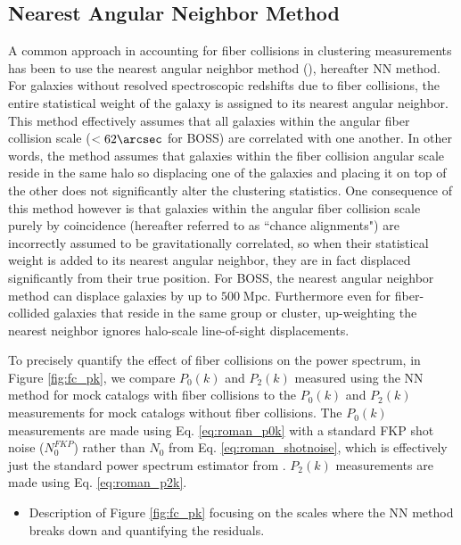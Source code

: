 \documentclass{emulateapj}
\begin{document}
\subsection{Nearest Angular Neighbor Method} \label{sec:fc_pk}
A common approach in accounting for fiber collisions in clustering measurements has been to use the nearest angular neighbor method (\citealt{Zehavi:2002aa, Berlind:2006aa, Anderson:2012aa}), hereafter NN method. For galaxies without resolved spectroscopic redshifts due to fiber collisions, the entire statistical weight of the galaxy is assigned to its nearest angular neighbor. This method effectively assumes that all galaxies within the angular fiber collision scale ($< 62 \arcsec$ for BOSS) are correlated with one another. In other words, the method assumes that galaxies within the fiber collision angular scale reside in the same halo so displacing one of the galaxies and placing it on top of the other does not significantly alter the clustering statistics. One consequence of this method however is that galaxies within the angular fiber collision scale purely by coincidence (hereafter referred to as ``chance alignments") are incorrectly assumed to be gravitationally correlated, so when their statistical weight is added to its nearest angular neighbor, they are in fact displaced significantly from their true position. For BOSS, the nearest angular neighbor method can displace galaxies by up to $500 \;\mathrm{Mpc}$. Furthermore even for fiber-collided galaxies that reside in the same group or cluster, up-weighting the nearest neighbor ignores halo-scale line-of-sight displacements. 

To precisely quantify the effect of fiber collisions on the power spectrum, in Figure \ref{fig:fc_pk}, we compare $P_0(k)$ and $P_2(k)$ measured using the NN method for mock catalogs with fiber collisions to the $P_0(k)$ and $P_2(k)$ measurements for mock catalogs without fiber collisions. The $P_0(k)$ measurements are made using Eq. \ref{eq:roman_p0k} with a standard FKP shot noise ($N_0^{FKP}$) rather than $N_0$ from Eq. \ref{eq:roman_shotnoise}, which is effectively just the standard power spectrum estimator from \cite{Feldman:1994aa}. $P_2(k)$ measurements are made using Eq. \ref{eq:roman_p2k}. 
\begin{itemize}
	\item Description of Figure \ref{fig:fc_pk} focusing on the scales where the NN method breaks down and quantifying the residuals. 
\end{itemize}
\end{document}
